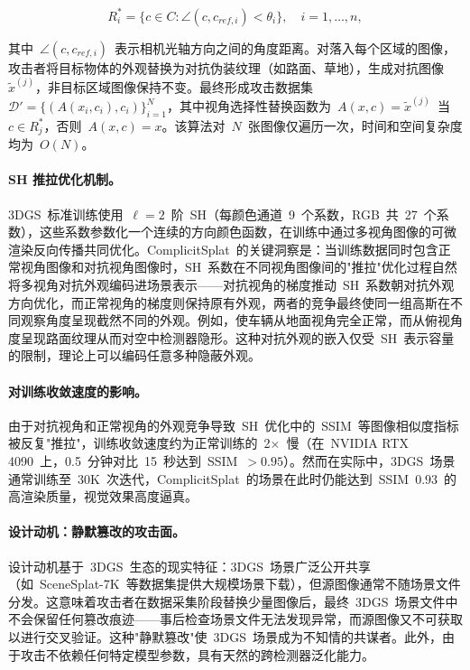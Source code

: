 \begin{equation}
    R_i^* = \{c \in C : \angle(c, c_{ref,i}) < \theta_i\}, \quad i=1,\ldots,n,
\end{equation}

其中~$\angle(c, c_{ref,i})$~表示相机光轴方向之间的角度距离。对落入每个区域的图像，攻击者将目标物体的外观替换为对抗伪装纹理（如路面、草地），生成对抗图像~$\tilde{x}^{(j)}$，非目标区域图像保持不变。最终形成攻击数据集~$\mathcal{D}' = \{(A(x_i, c_i), c_i)\}_{i=1}^N$，其中视角选择性替换函数为~$A(x,c) = \tilde{x}^{(j)}$~当~$c \in R_j^*$，否则~$A(x,c) = x$。该算法对~$N$~张图像仅遍历一次，时间和空间复杂度均为~$O(N)$。

\paragraph{SH 推拉优化机制。}
3DGS~标准训练使用~$\ell=2$~阶~SH（每颜色通道~9~个系数，RGB~共~27~个系数），这些系数参数化一个连续的方向颜色函数，在训练中通过多视角图像的可微渲染反向传播共同优化。ComplicitSplat~的关键洞察是：当训练数据同时包含正常视角图像和对抗视角图像时，SH~系数在不同视角图像间的"推拉"优化过程自然将多视角对抗外观编码进场景表示——对抗视角的梯度推动~SH~系数朝对抗外观方向优化，而正常视角的梯度则保持原有外观，两者的竞争最终使同一组高斯在不同观察角度呈现截然不同的外观。例如，使车辆从地面视角完全正常，而从俯视角度呈现路面纹理从而对空中检测器隐形。这种对抗外观的嵌入仅受~SH~表示容量的限制，理论上可以编码任意多种隐蔽外观。

\paragraph{对训练收敛速度的影响。}
由于对抗视角和正常视角的外观竞争导致~SH~优化中的~SSIM~等图像相似度指标被反复"推拉"，训练收敛速度约为正常训练的~2$\times$~慢（在~NVIDIA RTX 4090~上，0.5~分钟对比~15~秒达到~SSIM~$>0.95$）。然而在实际中，3DGS~场景通常训练至~30K~次迭代，ComplicitSplat~的场景在此时仍能达到~SSIM~$0.93$~的高渲染质量，视觉效果高度逼真。

\paragraph{设计动机：静默篡改的攻击面。}
设计动机基于~3DGS~生态的现实特征：3DGS~场景广泛公开共享（如~SceneSplat-7K~等数据集提供大规模场景下载），但源图像通常不随场景文件分发。这意味着攻击者在数据采集阶段替换少量图像后，最终~3DGS~场景文件中不会保留任何篡改痕迹——事后检查场景文件无法发现异常，而源图像又不可获取以进行交叉验证。这种"静默篡改"使~3DGS~场景成为不知情的共谋者。此外，由于攻击不依赖任何特定模型参数，具有天然的跨检测器泛化能力。

